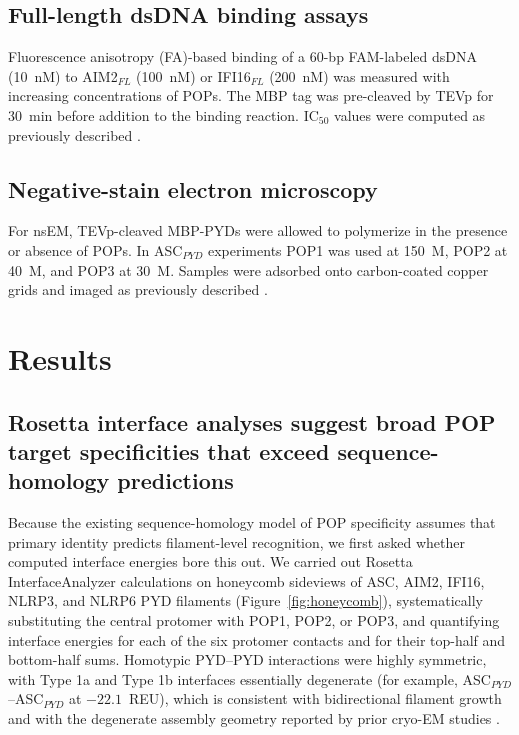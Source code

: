 \documentclass[11pt]{article}
\begin{document}
\subsection{Full-length dsDNA binding assays}

Fluorescence anisotropy (FA)-based binding of a 60-bp FAM-labeled dsDNA
(10~nM) to AIM2$_{FL}$ (100~nM) or IFI16$_{FL}$ (200~nM) was measured with
increasing concentrations of POPs. The MBP tag was pre-cleaved by TEVp for
30~min before addition to the binding reaction. IC$_{50}$ values were
computed as previously described \citep{matyszewski2018digital,
matyszewski2021distinct}.

\subsection{Negative-stain electron microscopy}

For nsEM, TEVp-cleaved MBP-PYDs were allowed to polymerize in the
presence or absence of POPs. In ASC$_{PYD}$ experiments POP1 was used at
150~\textmu M, POP2 at 40~\textmu M, and POP3 at 30~\textmu M. Samples
were adsorbed onto carbon-coated copper grids and imaged as previously
described \citep{shen2019nlrp6, matyszewski2021distinct}.

\section{Results}

\subsection{Rosetta interface analyses suggest broad POP target
specificities that exceed sequence-homology predictions}

Because the existing sequence-homology model of POP specificity assumes
that primary identity predicts filament-level recognition, we first asked
whether computed interface energies bore this out. We carried out Rosetta
InterfaceAnalyzer calculations on honeycomb sideviews of ASC, AIM2, IFI16,
NLRP3, and NLRP6 PYD filaments (Figure~\ref{fig:honeycomb}), systematically
substituting the central protomer with POP1, POP2, or POP3, and
quantifying interface energies for each of the six protomer contacts and
for their top-half and bottom-half sums. Homotypic PYD--PYD interactions
were highly symmetric, with Type 1a and Type 1b interfaces essentially
degenerate (for example, ASC$_{PYD}$--ASC$_{PYD}$ at $-22.1$~REU), which
is consistent with bidirectional filament growth and with the degenerate
assembly geometry reported by prior cryo-EM studies
\citep{lu2014unified, matyszewski2021distinct, hochheiser2022directionality}.
\end{document}
